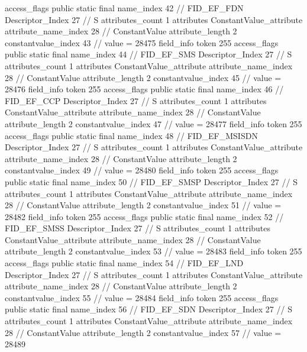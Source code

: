 {{{{{				access_flags	public static final
				name_index	42		// FID_EF_FDN
				Descriptor_Index	27		// S
				attributes_count	1
				attributes {
				ConstantValue_attribute {
					attribute_name_index	28		// ConstantValue
					attribute_length	2
					constantvalue_index	43		// value = 28475
				}
				}
			}
			field_info {
				token	255
				access_flags	public static final
				name_index	44		// FID_EF_SMS
				Descriptor_Index	27		// S
				attributes_count	1
				attributes {
				ConstantValue_attribute {
					attribute_name_index	28		// ConstantValue
					attribute_length	2
					constantvalue_index	45		// value = 28476
				}
				}
			}
			field_info {
				token	255
				access_flags	public static final
				name_index	46		// FID_EF_CCP
				Descriptor_Index	27		// S
				attributes_count	1
				attributes {
				ConstantValue_attribute {
					attribute_name_index	28		// ConstantValue
					attribute_length	2
					constantvalue_index	47		// value = 28477
				}
				}
			}
			field_info {
				token	255
				access_flags	public static final
				name_index	48		// FID_EF_MSISDN
				Descriptor_Index	27		// S
				attributes_count	1
				attributes {
				ConstantValue_attribute {
					attribute_name_index	28		// ConstantValue
					attribute_length	2
					constantvalue_index	49		// value = 28480
				}
				}
			}
			field_info {
				token	255
				access_flags	public static final
				name_index	50		// FID_EF_SMSP
				Descriptor_Index	27		// S
				attributes_count	1
				attributes {
				ConstantValue_attribute {
					attribute_name_index	28		// ConstantValue
					attribute_length	2
					constantvalue_index	51		// value = 28482
				}
				}
			}
			field_info {
				token	255
				access_flags	public static final
				name_index	52		// FID_EF_SMSS
				Descriptor_Index	27		// S
				attributes_count	1
				attributes {
				ConstantValue_attribute {
					attribute_name_index	28		// ConstantValue
					attribute_length	2
					constantvalue_index	53		// value = 28483
				}
				}
			}
			field_info {
				token	255
				access_flags	public static final
				name_index	54		// FID_EF_LND
				Descriptor_Index	27		// S
				attributes_count	1
				attributes {
				ConstantValue_attribute {
					attribute_name_index	28		// ConstantValue
					attribute_length	2
					constantvalue_index	55		// value = 28484
				}
				}
			}
			field_info {
				token	255
				access_flags	public static final
				name_index	56		// FID_EF_SDN
				Descriptor_Index	27		// S
				attributes_count	1
				attributes {
				ConstantValue_attribute {
					attribute_name_index	28		// ConstantValue
					attribute_length	2
					constantvalue_index	57		// value = 28489
}}}}}}}
